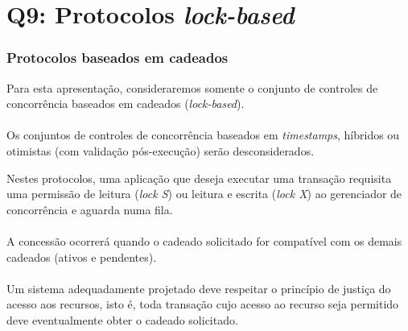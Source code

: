 \documentclass{beamer}
\begin{document}
\section{Q9: Protocolos \emph{lock-based}}

\begin{frame}
    \frametitle{Protocolos baseados em cadeados}
        Para esta apresentação, consideraremos somente o conjunto de controles de concorrência baseados em cadeados (\emph{lock-based}). \\~\\

        \newblock        
        Os conjuntos de controles de concorrência baseados em \emph{timestamps}, híbridos ou otimistas (com validação pós-execução) serão desconsiderados.
\end{frame}


\begin{frame}        
    Nestes protocolos, uma aplicação que deseja executar uma transação requisita uma permissão de leitura (\emph{lock S}) ou leitura e escrita (\emph{lock X}) ao gerenciador de concorrência e aguarda numa fila. \\~\\
        
    A concessão ocorrerá quando o cadeado solicitado for compatível com os demais cadeados (ativos e pendentes). \\~\\

    Um sistema adequadamente projetado deve respeitar o princípio de justiça do acesso aos recursos, isto é, toda transação cujo acesso ao recurso seja permitido deve eventualmente obter o cadeado solicitado. 
\end{frame}

\end{document}
